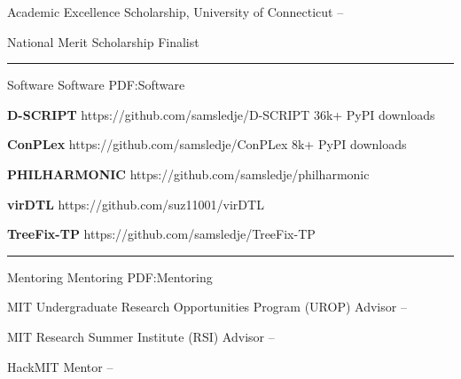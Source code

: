 \documentclass[letterpaper,MMMyyyy,nonstopmode]{simpleresumecv}
\begin{document}
\begin{Body}
\Entry
{Academic Excellence Scholarship, University of Connecticut}
\hfill
{} -- 
\Gap




\Entry
{National Merit Scholarship Finalist}
\hfill
{}

\BigGap
\hrule
\Section
{Software}
{Software}
{PDF:Software}

\Entry
{\textbf{D-SCRIPT}}
\hfill https://github.com/samsledje/D-SCRIPT
\Gap
\Item
36k+ PyPI downloads
\BigGap

\Entry
{\textbf{ConPLex}}
\hfill https://github.com/samsledje/ConPLex
\Gap
\Item
8k+ PyPI downloads
\BigGap

\Entry
{\textbf{PHILHARMONIC}}
\hfill https://github.com/samsledje/philharmonic
\BigGap

\Entry
{\textbf{virDTL}}
\hfill https://github.com/suz11001/virDTL
\BigGap

\Entry
{\textbf{TreeFix-TP}}
\hfill https://github.com/samsledje/TreeFix-TP
\BigGap



\BigGap
\hrule
\Section
{Mentoring}
{Mentoring}
{PDF:Mentoring}

\Entry
{MIT Undergraduate Research Opportunities Program (UROP) Advisor}
\hfill
{} -- 
\Gap

\Entry
{MIT Research Summer Institute (RSI) Advisor}
\hfill
{} -- 
\Gap

\Entry
{HackMIT Mentor}
\hfill
{} -- 
\Gap


\end{Body}
\end{document}
